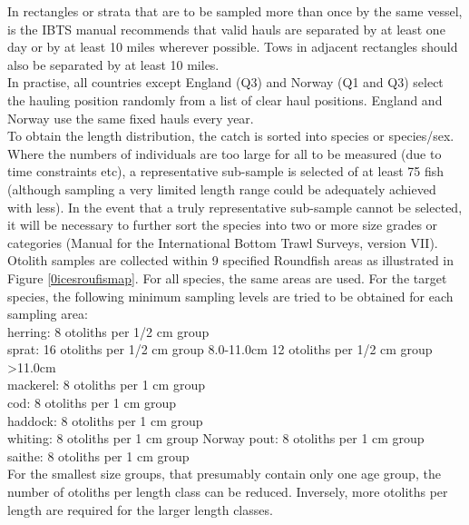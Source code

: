 \documentclass[useAMS,referee]{biom}
\numberwithin{equation}{section}
\begin{document}
\indent   In rectangles or strata that are to be sampled more than once by the same vessel, is the IBTS manual recommends that valid hauls are separated by at least one day or by at least 10 miles wherever possible. Tows in adjacent rectangles should also be separated by at least 10 miles. \\

\indent   In practise, all countries except England (Q3) and Norway (Q1 and Q3) select the hauling position randomly from a list of clear haul positions. England and Norway use the same fixed hauls every year.  \\
  
\indent  To obtain the length distribution, the catch is sorted into species or species/sex. Where the numbers of individuals are too large for all to be measured (due to time constraints etc), a representative sub-sample is selected of at least 75 fish (although sampling a very limited length range could be adequately achieved with less). In the event that a truly representative sub-sample cannot be selected, it will be necessary to further sort the species into two or more size grades or categories (Manual for the International Bottom Trawl Surveys, version VII). \\

 \indent Otolith samples are collected within 9 specified Roundfish areas as illustrated in Figure \ref{0icesroufismap}. For all species, the same areas are used. For the target species, the following minimum sampling levels are tried to be obtained for each sampling area: \\
   
\noindent herring:  8 otoliths per 1/2 cm group \\
sprat:   16 otoliths per 1/2 cm group 8.0-11.0cm 12 otoliths per 1/2 cm group >11.0cm \\
 mackerel:  8 otoliths per 1 cm group\\
 cod:   8 otoliths per 1 cm group \\
 haddock:  8 otoliths per 1 cm group\\
 whiting:  8 otoliths per 1 cm group 
 Norway pout:  8 otoliths per 1 cm group \\
  saithe:   8 otoliths per 1 cm group \\
 
For the smallest size groups, that presumably contain only one age group, the number of otoliths per length class can be reduced. Inversely, more otoliths per length are required for the larger length classes. 
\end{document}
